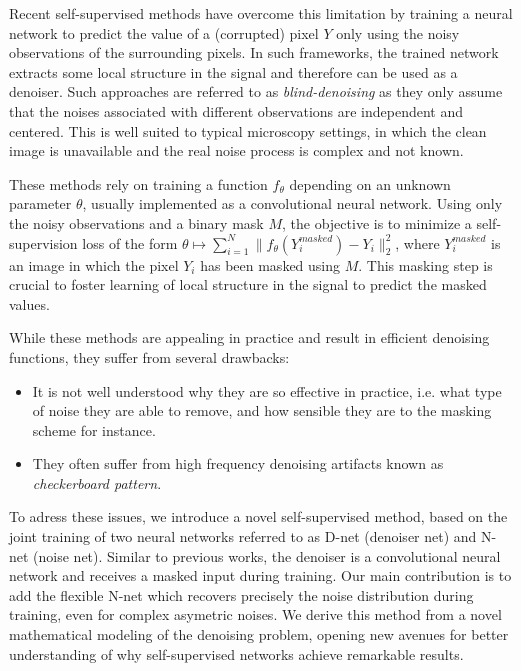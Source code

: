 \documentclass{article}
\begin{document}
Recent self-supervised methods have overcome this limitation \cite{batson2019noise2self,krull2018noise2void} by training a neural network to predict the value of a (corrupted) pixel $Y$ only using the noisy observations of the surrounding pixels. In such frameworks, the trained network extracts some local structure in the signal and therefore can be used as a denoiser. Such approaches are referred to as \textit{blind-denoising} as they only assume that the noises associated with different observations are independent and centered. This is well suited to typical microscopy settings, in which the clean image is unavailable and the real noise process is complex and not known.

These methods rely on training a function $f_\theta$ depending on an unknown parameter $\theta$, usually implemented as a convolutional neural network. Using only the noisy observations and a binary mask $M$, the objective is to minimize a self-supervision loss of the form $\theta\mapsto \sum_{i=1}^N \|f_\theta(Y^{masked}_i) - Y_i\|_2^2$,
where $Y^{masked}_i$ is an image in which the pixel $Y_i$ has been masked using $M$. This masking step is crucial to foster learning of local structure in the signal to predict the masked values.

While these methods are appealing in practice and result in efficient denoising functions, they suffer from several drawbacks:
\begin{itemize}
  \item It is not well understood why they are so effective in practice, i.e. what type of noise they are able to remove, and how sensible they are to the masking scheme for instance.
  \item They often suffer from high frequency denoising artifacts known as \textit{checkerboard pattern}.
\end{itemize}

To adress these issues, we introduce a novel self-supervised method, based on the joint training of two neural networks referred to as D-net (denoiser net) and N-net (noise net). Similar to previous works, the denoiser is a convolutional neural network and receives a masked input during training.
Our main contribution is to add the flexible N-net which recovers precisely the noise distribution during training, even for complex asymetric noises.
We derive this method from a novel mathematical modeling of the denoising problem, opening new avenues for better understanding of why self-supervised networks achieve remarkable results.
\end{document}
